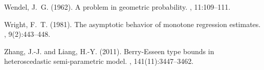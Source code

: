 \documentclass{article}
\numberwithin{myalgctr}{section}
\begin{document}
\begin{thebibliography}{}
Wendel, J.~G. (1962).
\newblock A problem in geometric probability.
, 11:109--111.

Wright, F.~T. (1981).
\newblock The asymptotic behavior of monotone regression estimates.
, 9(2):443--448.

Zhang, J.-J. and Liang, H.-Y. (2011).
\newblock Berry-{E}sseen type bounds in heteroscedastic semi-parametric model.
, 141(11):3447--3462.

\end{thebibliography}
\end{document}
